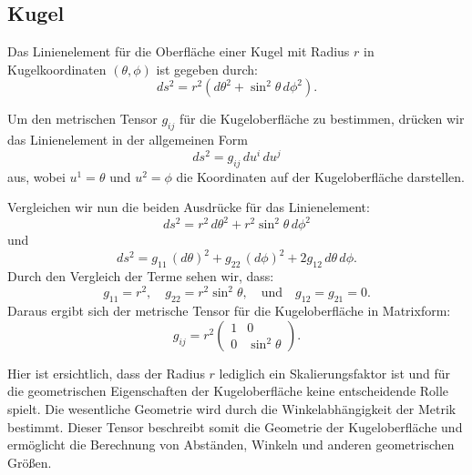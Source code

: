 %
%
%
%
\subsection{Kugel\label{geodaeten:section:MetrischerTensor:Kugel}}

Das Linienelement für die Oberfläche einer Kugel mit Radius $r$ in Kugelkoordinaten $(\theta, \phi)$ ist gegeben durch:
\begin{equation}
	ds^2 = r^2 \left( d\theta^2 + \sin^2\theta \, d\phi^2 \right).
\end{equation}

Um den metrischen Tensor $g_{ij}$ für die Kugeloberfläche zu bestimmen, drücken wir das Linienelement in der allgemeinen Form
\begin{equation}
	ds^2 = g_{ij} \, du^i \, du^j
\end{equation}
aus, wobei $u^1 = \theta$ und $u^2 = \phi$ die Koordinaten auf der Kugeloberfläche darstellen.

Vergleichen wir nun die beiden Ausdrücke für das Linienelement:
\begin{equation}
	ds^2 = r^2 \, d\theta^2 + r^2 \sin^2\theta \, d\phi^2
\end{equation}
und
\begin{equation}
	ds^2 = g_{11} \, (d\theta)^2 + g_{22} \, (d\phi)^2 + 2g_{12} \, d\theta \, d\phi.
\end{equation}
Durch den Vergleich der Terme sehen wir, dass:
\begin{equation}
	g_{11} = r^2, \quad g_{22} = r^2 \sin^2\theta, \quad \text{und} \quad g_{12} = g_{21} = 0.
\end{equation}
Daraus ergibt sich der metrische Tensor für die Kugeloberfläche in Matrixform:
\begin{equation}
	g_{ij} = r^2 \begin{pmatrix}
		1 & 0 \\
		0 & \sin^2\theta
	\end{pmatrix}.
\end{equation}

Hier ist ersichtlich, dass der Radius $r$ lediglich ein Skalierungsfaktor ist und für die geometrischen Eigenschaften der Kugeloberfläche keine entscheidende Rolle spielt. 
Die wesentliche Geometrie wird durch die Winkelabhängigkeit der Metrik bestimmt.
Dieser Tensor beschreibt somit die Geometrie der Kugeloberfläche und ermöglicht die Berechnung von Abständen, Winkeln und anderen geometrischen Größen.